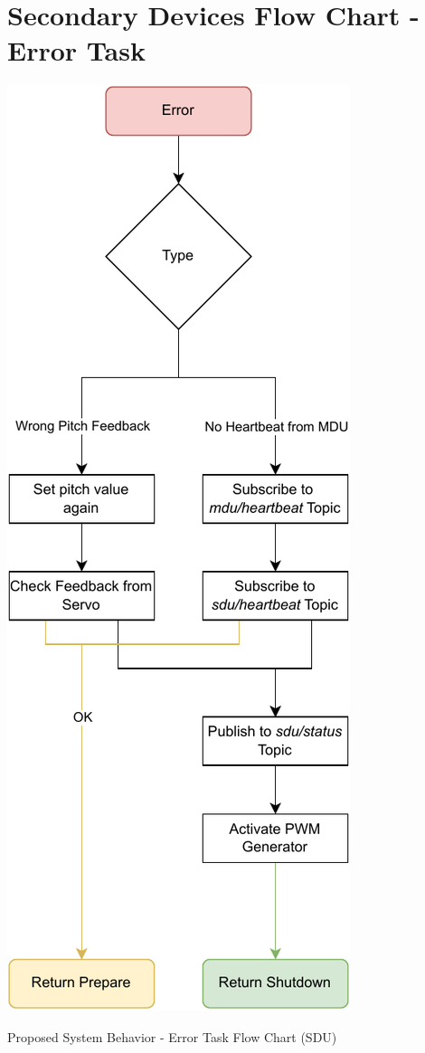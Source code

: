 
\chapter{Secondary Devices Flow Chart - Error Task} %

\label{AppendixG}

\begin{algorithm}[H]
    \centering
    \includegraphics[scale=0.8]{appendices/assets/SDU_ERROR.pdf}
    \caption{Proposed System Behavior - Error Task Flow Chart (SDU)}
    \label{alg:SDU_ERROR}
\end{algorithm}

